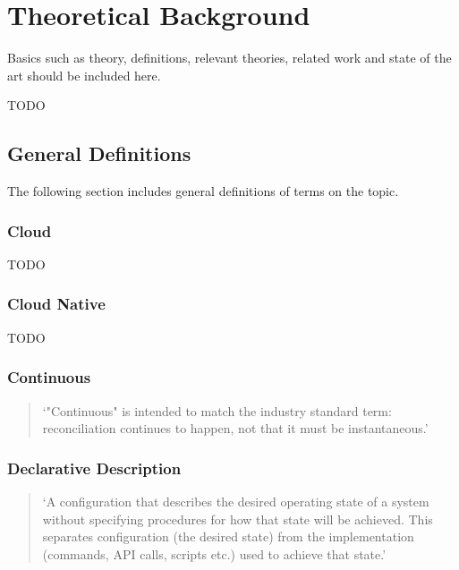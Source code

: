 \chapter{Theoretical Background} 	%

Basics such as theory, definitions, relevant theories, related work and state of the art should be included here.

TODO


\section{General Definitions}
\label{theoretical-background:general-definitions}

The following section includes general definitions of terms on the topic.

\subsection*{Cloud}

TODO

\subsection*{Cloud Native}

TODO

\subsection*{Continuous}
\begin{quotation}
\noindent
\enquote*{"Continuous" is intended to match the industry standard term: reconciliation continues to happen, not that it must be instantaneous.}
\autocite{gitopsGlossary}
\end{quotation}

\subsection*{Declarative Description}
\begin{quotation}
\noindent
\enquote*{A configuration that describes the desired operating state of a system without specifying procedures for how that state will be achieved. This separates configuration (the desired state) from the implementation (commands, API calls, scripts etc.) used to achieve that state.}
\autocite{gitopsGlossary}
\end{quotation}

